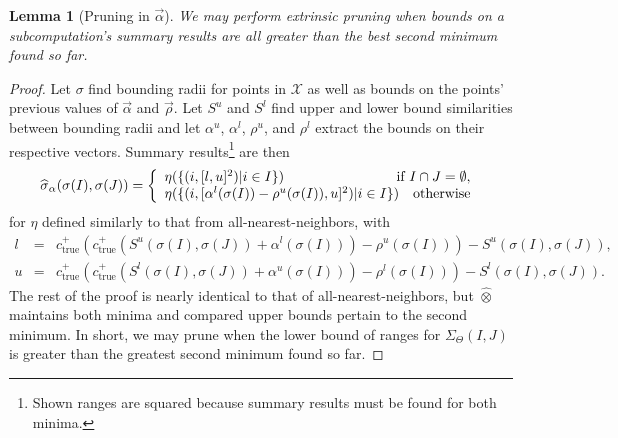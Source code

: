 \documentclass{article}
\newtheorem{lemma}{Lemma}
\newcommand{\killspace}{\vspace{-0.08in}}
\newcommand{\GNP}[1][\psi]{{#1}_{\Theta}}
\newcommand{\sigmahat}{\mathbin{\widehat{\sigma}}}
\newcommand{\otimeshat}{\mathbin{\widehat{\otimes}}}
\newcommand{\simhrectmin}{S^{l}}
\newcommand{\simhrectmax}{S^{u}}
\newcommand{\true}{\text{true}}
\newcommand{\ocpos}[1]{c^{+}_{#1}}
\newcommand{\vecrho}{\vec{\rho}}
\newcommand{\vecalpha}{\vec{\alpha}}
\newcommand{\falphamax}{\alpha^{u}}
\newcommand{\falphamin}{\alpha^{l}}
\newcommand{\frhomax}{\rho^{u}}
\newcommand{\frhomin}{\rho^{l}}
\begin{document}
\begin{lemma}[Pruning in $\vecalpha$]
  We may perform extrinsic pruning when bounds on a subcomputation's summary results are all greater than the best second minimum found so far.
\end{lemma}
\killspace
\begin{proof}
  Let $\sigma$ find bounding radii for points in $\mathcal{X}$ as well as bounds on the points' previous values of $\vecalpha$ and $\vecrho$.
  Let $\simhrectmax$ and $\simhrectmin$ find upper and lower bound similarities
  between bounding radii and let $\falphamax$, $\falphamin$, $\frhomax$, and
  $\frhomin$ extract the bounds on their respective vectors.  Summary results\footnote{Shown ranges are squared because summary results must be found for both minima.} are then
  \[
  \sigmahat_{\alpha}(\sigma(I),\sigma(J)) = \left\{ \begin{array}{lrr}
    \eta(\{(i,[l, u]^2) | i \in I\}) & \multicolumn{2}{r}{\mbox{if } I \cap J = \emptyset,} \\
    \multicolumn{2}{l}{\eta(\{(i,[\falphamin(\sigma(I)) - \frhomax(\sigma(I)), u]^2) | i \in I\})} & \mbox{otherwise}
  \end{array} \right. \\
  \]
  for $\eta$ defined similarly to that from all-nearest-neighbors, with
  \begin{eqnarray*}
    l & = & \ocpos{\true}(\ocpos{\true}(\simhrectmax(\sigma(I),\sigma(J)) + \falphamin(\sigma(I))) - \frhomax(\sigma(I))) - \simhrectmax(\sigma(I),\sigma(J)), \\
    u & = & \ocpos{\true}(\ocpos{\true}(\simhrectmin(\sigma(I),\sigma(J)) + \falphamax(\sigma(I))) - \frhomin(\sigma(I))) - \simhrectmin(\sigma(I),\sigma(J)).
  \end{eqnarray*}
  The rest of the proof is nearly identical to that of
  all-nearest-neighbors, but $\otimeshat$ maintains both minima and
  compared upper bounds pertain to the second minimum.  In short, we
  may prune when the lower bound of ranges for $\GNP[\Sigma](I,J)$ is
  greater than the greatest second minimum found so far.
\end{proof}
\end{document}
